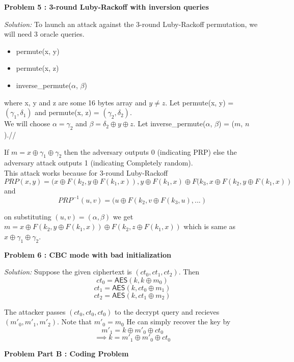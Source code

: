 \documentclass[a4paper, 11pt]{article}
\newenvironment{solution}
    {\textit{Solution:}}
    {\clearpage}
\newcommand{\prob}[1]{\begin{mdframed}[backgroundcolor=gray!20] \textbf{Problem #1}\end{mdframed}}
\newcommand{\AES}{\mathsf{AES}}
\begin{document}
\prob{5 : 3-round Luby-Rackoff with inversion queries}
\begin{solution}
   To launch an attack against the 3-round Luby-Rackoff permutation, we will need 3 oracle queries.
   \begin{itemize}
       \item permute(x, y)
       \item permute(x, z)
       \item inverse\_permute($\alpha$, $\beta$)
   \end{itemize}
   where x, y and z are some 16 bytes array and $y \neq z$. Let permute(x, y) = $(\gamma_1, \delta_1)$ and permute(x, z) = $(\gamma_2, \delta_2)$. \\
   We will choose $\alpha = \gamma_2$ and $\beta = \delta_2 \oplus y \oplus z$. Let inverse\_permute($\alpha$, $\beta$) = ($m$, $n$).//

   If $ m = x \oplus \gamma_1 \oplus \gamma_2$ then the adversary outputs 0 (indicating PRP) else the adversary attack outputs 1 (indicating Completely random).\\

   This attack works because for 3-round Luby-Rackoff $$PRP(x, y) = (x \oplus F(k_2, y \oplus F(k_1, x)), y \oplus F(k_1, x) \oplus F(k_3, x \oplus F(k_2, y \oplus F(k_1, x))$$
   and 
   $$PRP^{-1}(u, v) = (u \oplus F(k_2, v \oplus F(k_3, u), ... )$$

   on substituting $(u, v) = (\alpha, \beta)$ we get $m = x \oplus F(k_2, y \oplus F(k_1, x)) \oplus F(k_2, z \oplus F(k_1, x))$ which is same as $x \oplus \gamma_1 \oplus \gamma_2$.
\end{solution}


\prob{6 : CBC mode with bad initialization}
\begin{solution}
   Suppose the given ciphertext is $(ct_0, ct_1, ct_2)$. Then 
   $$ct_0=\AES(k,k\oplus m_0)$$
   $$ct_1=\AES(k,ct_0\oplus m_1)$$
   $$ct_2=\AES(k,ct_1\oplus m_2)$$
   
   The attacker passes $(ct_0, ct_0, ct_0)$ to the decrypt query and recieves $(m'_0,m'_1,m'_2)$. Note that $m'_0=m_0$ He can simply recover the key by 
   $$m'_1=k\oplus m'_0\oplus ct_0$$
   $$\implies k=m'_1\oplus m'_0\oplus ct_0$$
\end{solution}


\prob{Part B : Coding Problem}
\end{document}
